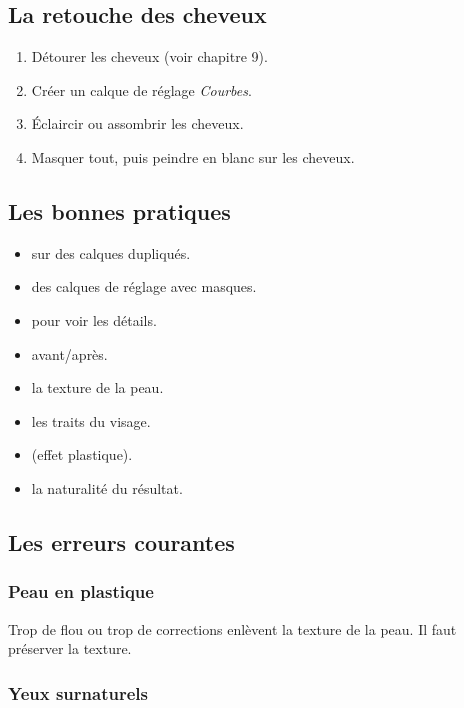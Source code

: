 \subsection{La retouche des cheveux}

\begin{enumerate}
    \item Détourer les cheveux (voir chapitre 9).
    \item Créer un calque de réglage \emph{Courbes}.
    \item Éclaircir ou assombrir les cheveux.
    \item Masquer tout, puis peindre en blanc sur les cheveux.
\end{enumerate}

\subsection{Les bonnes pratiques}

\begin{itemize}
    \item {} sur des calques dupliqués.
    \item {} des calques de réglage avec masques.
    \item {} pour voir les détails.
    \item {} avant/après.
    \item {} la texture de la peau.
    \item {} les traits du visage.
    \item {} (effet plastique).
    \item {} la naturalité du résultat.
\end{itemize}

\subsection{Les erreurs courantes}

\subsubsection{Peau en plastique}

Trop de flou ou trop de corrections enlèvent la texture de la peau. Il faut préserver la texture.

\subsubsection{Yeux surnaturels}


